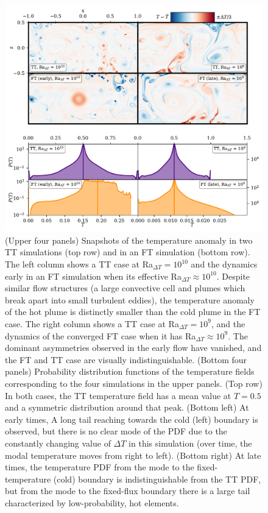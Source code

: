 \documentclass[aps, pre, onecolumn, nofootinbib, notitlepage, groupedaddress, amsfonts, amssymb, amsmath, longbibliography, superscriptaddress]{revtex4-1}
\begin{document}
\begin{figure}[ht!]
\includegraphics[width=\textwidth]{./figs/rbc_evolution_dynamics.pdf}
\caption{ 
	(Upper four panels) Snapshots of the temperature anomaly in two TT simulations (top row) and in an FT simulation (bottom row).
	The left column shows a TT case at Ra$_{\Delta T} = 10^{10}$ and the dynamics early in an FT simulation when its effective Ra$_{\Delta T} \approx 10^{10}$.
	Despite similar flow structures (a large convective cell and plumes which break apart into small turbulent eddies), the temperature anomaly of the hot plume is distinctly smaller than the cold plume in the FT case.
	The right column shows a TT case at Ra$_{\Delta T} = 10^9$, and the dynamics of the converged FT case when it has Ra$_{\Delta T} \approx 10^9$.
	The dominant asymmetries observed in the early flow have vanished, and the FT and TT case are visually indistinguishable.
	(Bottom four panels) Probability distribution functions of the temperature fields corresponding to the four simulations in the upper panels.
	(Top row) In both cases, the TT temperature field has a mean value at $T = 0.5$ and a symmetric distribution around that peak. 
	(Bottom left) At early times, A long tail reaching towards the cold (left) boundary is observed, but there is no clear mode of the PDF due to the constantly changing value of $\Delta T$ in this simulation (over time, the modal temperature moves from right to left).
	(Bottom right) At late times, the temperature PDF from the mode to the fixed-temperature (cold) boundary is indistinguishable from the TT PDF, but from the mode to the fixed-flux boundary there is a large tail characterized by low-probability, hot elements.
	\label{fig:rbc_evolution_dynamics} }
\end{figure}
\end{document}
